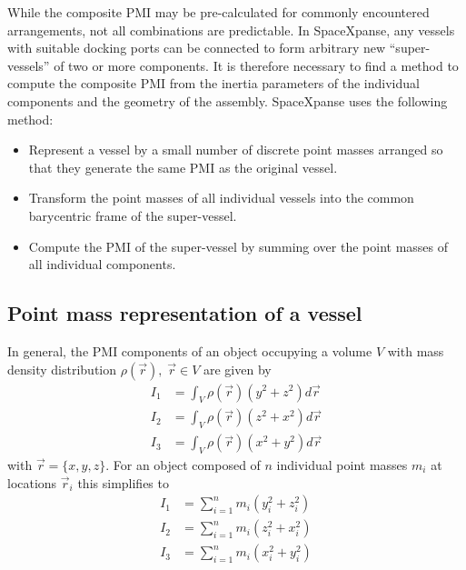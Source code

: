\documentclass[a4paper]{article}
\begin{document}
While the composite PMI may be pre-calculated for commonly encountered arrangements, not all combinations are predictable. In SpaceXpanse, any vessels with suitable docking ports can be connected to form arbitrary new ``super-vessels'' of two or more components. It is therefore necessary to find a method to compute the composite PMI from the inertia parameters of the individual components and the geometry of the assembly.
SpaceXpanse uses the following method:
\begin{itemize}
\item Represent a vessel by a small number of discrete point masses arranged so that they generate the same PMI as the original vessel.
\item Transform the point masses of all individual vessels into the common barycentric frame of the super-vessel.
\item Compute the PMI of the super-vessel by summing over the point masses of all individual components.
\end{itemize}

\subsection{Point mass representation of a vessel}
In general, the PMI components of an object occupying a volume $V$ with mass density distribution $\rho(\vec{r}),\; \vec{r}\in V$ are given by
\begin{equation}
\begin{split}
  I_1 &= \int_V \rho(\vec{r}) (y^2 + z^2) d\vec{r} \\
  I_2 &= \int_V \rho(\vec{r}) (z^2 + x^2) d\vec{r} \\
  I_3 &= \int_V \rho(\vec{r}) (x^2 + y^2) d\vec{r}
\end{split}
\end{equation}
with $\vec{r} = \lbrace x,y,z \rbrace$.
For an object composed of $n$ individual point masses $m_i$ at locations $\vec{r}_i$ this simplifies to
\begin{equation}
\begin{split}
  I_1 &= \sum_{i=1}^n m_i (y_i^2 + z_i^2) \\
  I_2 &= \sum_{i=1}^n m_i (z_i^2 + x_i^2) \\
  I_3 &= \sum_{i=1}^n m_i (x_i^2 + y_i^2)
\end{split}
\end{equation}
\end{document}
